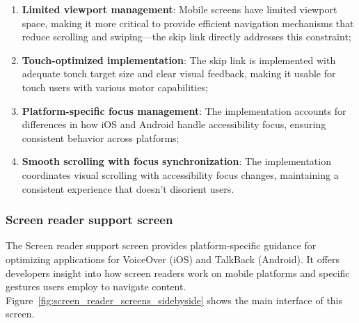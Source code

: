 \begin{enumerate}
    \item \textbf{Limited viewport management}: Mobile screens have limited viewport space, making it more critical to provide efficient navigation mechanisms that reduce scrolling and swiping—the skip link directly addresses this constraint;
    
    \item \textbf{Touch-optimized implementation}: The skip link is implemented with adequate touch target size and clear visual feedback, making it usable for touch users with various motor capabilities;
    
    \item \textbf{Platform-specific focus management}: The implementation accounts for differences in how iOS and Android handle accessibility focus, ensuring consistent behavior across platforms;
    
    \item \textbf{Smooth scrolling with focus synchronization}: The implementation coordinates visual scrolling with accessibility focus changes, maintaining a consistent experience that doesn't disorient users.
\end{enumerate}

\subsubsection{Screen reader support screen}
\label{subsubsec:screen-reader-support}

The Screen reader support screen provides platform-specific guidance for optimizing applications for VoiceOver (iOS) and TalkBack (Android). It offers developers insight into how screen readers work on mobile platforms and specific gestures users employ to navigate content. Figure~\ref{fig:screen_reader_screens_sidebyside} shows the main interface of this screen.

